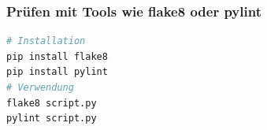 \documentclass{vorlage-design-main}
\begin{document}
\subsubsection{Prüfen mit Tools wie flake8 oder
pylint}\label{pruefen-mit-tools-wie-flake8-oder-pylint}

\begin{lstlisting}[language=bash]
# Installation
pip install flake8
pip install pylint
# Verwendung
flake8 script.py
pylint script.py
\end{lstlisting}



\clearpage
\printbibliography
\end{document}
